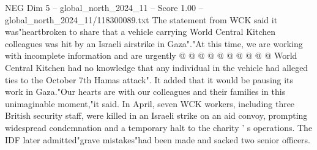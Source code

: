 \begin{textsample}{NEG Dim 5 – global\_north\_2024\_11 – Score 1.00 – global\_north\_2024\_11/118300089.txt}
The statement from WCK said it was"heartbroken to share that a vehicle carrying World Central Kitchen colleagues was hit by an Israeli airstrike in Gaza"."At this time, we are working with incomplete information and are urgently @ @ @ @ @ @ @ @ @ @ World Central Kitchen had no knowledge that any individual in the vehicle had alleged ties to the October 7th Hamas attack".
It added that it would be pausing its work in Gaza."Our hearts are with our colleagues and their families in this unimaginable moment,"it said.
In April, seven WCK workers, including three British security staff, were killed in an Israeli strike on an aid convoy, prompting widespread condemnation and a temporary halt to the charity ' s operations.
The IDF later admitted"grave mistakes"had been made and sacked two senior officers.

\end{textsample}
